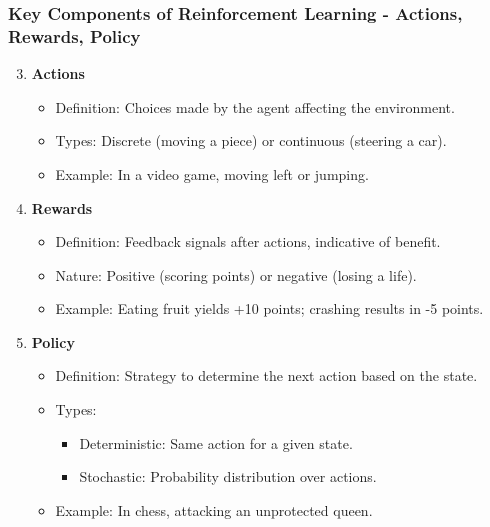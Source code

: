 \documentclass[aspectratio=169]{beamer}
\begin{document}
\begin{frame}[fragile]
    \frametitle{Key Components of Reinforcement Learning - Actions, Rewards, Policy}
    \begin{enumerate}
        \setcounter{enumi}{2} %
        \item \textbf{Actions}
        \begin{itemize}
            \item Definition: Choices made by the agent affecting the environment.
            \item Types: Discrete (moving a piece) or continuous (steering a car).
            \item Example: In a video game, moving left or jumping.
        \end{itemize}
        
        \item \textbf{Rewards}
        \begin{itemize}
            \item Definition: Feedback signals after actions, indicative of benefit.
            \item Nature: Positive (scoring points) or negative (losing a life).
            \item Example: Eating fruit yields +10 points; crashing results in -5 points.
        \end{itemize}
        
        \item \textbf{Policy}
        \begin{itemize}
            \item Definition: Strategy to determine the next action based on the state.
            \item Types: 
            \begin{itemize}
                \item Deterministic: Same action for a given state.
                \item Stochastic: Probability distribution over actions.
            \end{itemize}
            \item Example: In chess, attacking an unprotected queen.
        \end{itemize}
    \end{enumerate}
\end{frame}
\end{document}
